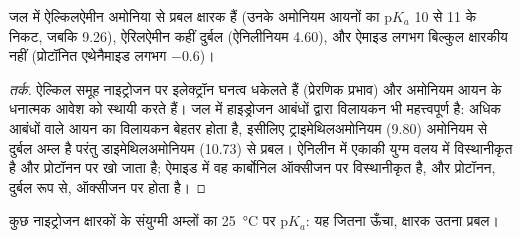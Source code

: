 \begin{proposition}[क्षारकता]\label{prop:b2:amines:basicity}
जल में ऐल्किलऐमीन अमोनिया से प्रबल क्षारक हैं (उनके अमोनियम आयनों का $\mathrm pK_a$
10 से 11 के निकट, जबकि 9.26), ऐरिलऐमीन कहीं दुर्बल (ऐनिलीनियम 4.60), और ऐमाइड
लगभग बिल्कुल क्षारकीय नहीं (प्रोटॉनित एथेनैमाइड लगभग $-0.6$)।
\end{proposition}

\begin{proof}[तर्क]
ऐल्किल समूह नाइट्रोजन पर इलेक्ट्रॉन घनत्व धकेलते हैं (प्रेरणिक प्रभाव) और
अमोनियम आयन के धनात्मक आवेश को स्थायी करते हैं। जल में हाइड्रोजन आबंधों द्वारा विलायकन भी महत्त्वपूर्ण है:
अधिक  आबंधों वाले आयन का विलायकन बेहतर होता है, इसीलिए ट्राइमेथिलअमोनियम (9.80)
अमोनियम से दुर्बल अम्ल है परंतु डाइमेथिलअमोनियम (10.73) से प्रबल। ऐनिलीन में एकाकी
युग्म वलय में विस्थानीकृत है और प्रोटॉनन पर खो जाता है; ऐमाइड में वह
कार्बोनिल ऑक्सीजन पर विस्थानीकृत है, और प्रोटॉनन, दुर्बल रूप से, ऑक्सीजन पर होता है।
\end{proof}

\begin{omfigure}

{\small कुछ नाइट्रोजन क्षारकों के संयुग्मी अम्लों का \qty{25}{\degreeCelsius} पर
$\mathrm pK_a$: यह जितना ऊँचा, क्षारक उतना प्रबल।}
\end{omfigure}

